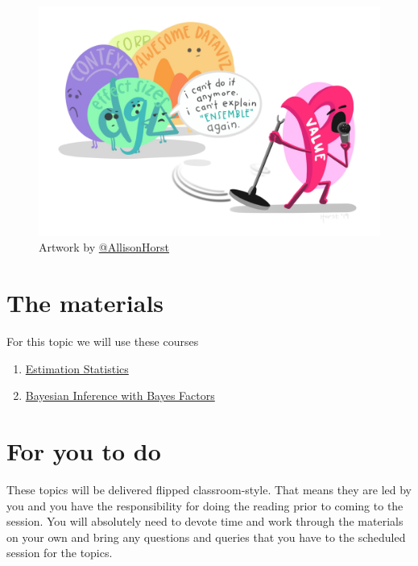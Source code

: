 \documentclass[
]{book}
\providecommand{\tightlist}{%
  \setlength{\itemsep}{0pt}\setlength{\parskip}{0pt}}
\begin{document}
\begin{figure}
\centering
\includegraphics{p_value_mic_hog.jpg}
\caption{\label{fig:unnamed-chunk-5}Artwork by \href{https://github.com/allisonhorst}{@AllisonHorst}}
\end{figure}

\hypertarget{the-materials-3}{%
\section{The materials}\label{the-materials-3}}

For this topic we will use these courses

\begin{enumerate}
\def\labelenumi{\arabic{enumi}.}
\tightlist
\item
  \href{https://danmaclean.github.io/estimation_statistics/}{Estimation Statistics}
\item
  \href{https://danmaclean.github.io/bayes_factors/}{Bayesian Inference with Bayes Factors}
\end{enumerate}

\hypertarget{for-you-to-do-3}{%
\section{For you to do}\label{for-you-to-do-3}}

These topics will be delivered flipped classroom-style. That means they are led by you and you have the responsibility for doing the reading prior to coming to the session. You will absolutely need to devote time and work through the materials on your own and bring any questions and queries that you have to the scheduled session for the topics.
\end{document}
